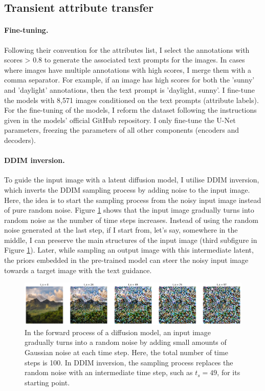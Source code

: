 \subsection{Transient attribute transfer}

\paragraph{Fine-tuning.} Following their convention for the attributes list, I select the annotations with scores > 0.8 to generate the associated text prompts for the images. In cases where images have multiple annotations with high scores, I merge them with a comma separator. For example, if an image has high scores for both the 'sunny' and 'daylight' annotations, then the text prompt is 'daylight, sunny'. I fine-tune the models with 8,571 images conditioned on the text prompts (attribute labels). For the fine-tuning of the models, I reform the dataset following the instructions given in the models' official GitHub repository. I only fine-tune the U-Net parameters, freezing the parameters of all other components (encoders and decoders).




\paragraph{DDIM inversion.} To guide the input image with a latent diffusion model, I utilise \gls{DDIM} inversion, which inverts the DDIM sampling process by adding noise to the input image. Here, the idea is to start the sampling process from the noisy input image instead of pure random noise. Figure \ref{fig:ddim-inversion} shows that the input image gradually turns into random noise as the number of time steps increases. Instead of using the random noise generated at the last step, if I start from, let’s say, somewhere in the middle, I can preserve the main structures of the input image (third subfigure in Figure  \ref{fig:ddim-inversion}). Later, while sampling an output image with this intermediate latent, the priors embedded in the pre-trained model can steer the noisy input image towards a target image with the text guidance.

\begin{figure}[ht]
  \includegraphics[width=\textwidth]{Chapters/zero-shot-tat-figs/DDIM_forward.png}
  \caption{In the forward process of a diffusion model, an input image gradually turns into a random noise by adding small amounts of Gaussian noise at each time step. Here, the total number of time steps is 100. In DDIM inversion, the sampling process replaces the random noise with an intermediate time step, such as $t_s = 49$, for its starting point.}
  \label{fig:ddim-inversion}
\end{figure}

